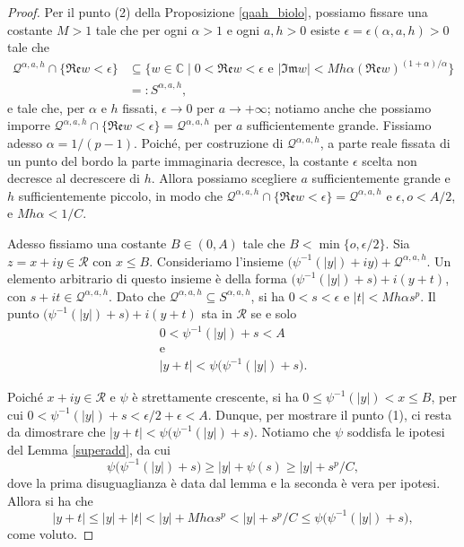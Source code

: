 \begin{proof}
    Per il punto (2) della Proposizione \ref{qaah_biolo}, possiamo fissare una costante $M>1$ tale che per ogni $\alpha>1$ e ogni $a,h>0$ esiste $\epsilon=\epsilon(\alpha,a,h)>0$ tale che
    \begin{align*}
        \mathcal{Q}^{\alpha,a,h}\cap\{\mathfrak{Re}w<\epsilon\}&\subseteq \{w\in\mathbb{C}\mid 0<\mathfrak{Re}w<\epsilon\text{ e }|\mathfrak{Im}w|<Mh\alpha(\mathfrak{Re}w)^{(1+\alpha)/\alpha}\}\\
        &=:S^{\alpha,a,h},
    \end{align*}
    e tale che, per $\alpha$ e $h$ fissati, $\epsilon\longrightarrow0$ per $a\longrightarrow+\infty$; notiamo anche che possiamo imporre $\mathcal{Q}^{\alpha,a,h}\cap\{\mathfrak{Re}w<\epsilon\}=\mathcal{Q}^{\alpha,a,h}$ per $a$ sufficientemente grande. Fissiamo adesso $\alpha=1/(p-1)$. Poiché, per costruzione di $\mathcal{Q}^{\alpha,a,h}$, a parte reale fissata di un punto del bordo la parte immaginaria decresce, la costante $\epsilon$ scelta non decresce al decrescere di $h$. Allora possiamo scegliere $a$ sufficientemente grande e $h$ sufficientemente piccolo, in modo che $\mathcal{Q}^{\alpha,a,h}\cap\{\mathfrak{Re}w<\epsilon\}=\mathcal{Q}^{\alpha,a,h}$ e $\epsilon,o<A/2$, e $Mh\alpha<1/C$.
    
    Adesso fissiamo una costante $B\in(0,A)$ tale che $B<\min\{o,\epsilon/2\}$. Sia $z=x+iy\in\mathcal{R}$ con $x\le B$. Consideriamo l'insieme $\bigl(\psi^{-1}(|y|)+iy\bigr)+\mathcal{Q}^{\alpha,a,h}$. Un elemento arbitrario di questo insieme è della forma $\bigl(\psi^{-1}(|y|)+s\bigr)+i(y+t)$, con $s+it\in\mathcal{Q}^{\alpha,a,h}$. Dato che $\mathcal{Q}^{\alpha,a,h}\subseteq S^{\alpha,a,h}$, si ha $0<s<\epsilon$ e $|t|<Mh\alpha s^p$. Il punto $\bigl(\psi^{-1}(|y|)+s\bigr)+i(y+t)$ sta in $\mathcal{R}$ se e solo \begin{gather*}
        0<\psi^{-1}(|y|)+s<A\\
        \text{e}\\
        |y+t|<\psi\big(\psi^{-1}(|y|)+s\big).
    \end{gather*}

    Poiché $x+iy\in\mathcal{R}$ e $\psi$ è strettamente crescente, si ha $0 \le \psi^{-1}(|y|)<x\le B$, per cui $0<\psi^{-1}(|y|)+s<\epsilon/2+\epsilon<A$. Dunque, per mostrare il punto (1), ci resta da dimostrare che $|y+t|<\psi\big(\psi^{-1}(|y|)+s\big)$. Notiamo che $\psi$ soddisfa le ipotesi del Lemma \ref{superadd}, da cui
    $$\psi\big(\psi^{-1}(|y|)+s\big)\ge |y|+\psi(s)\ge |y|+s^p/C,$$
    dove la prima disuguaglianza è data dal lemma e la seconda è vera per ipotesi. Allora si ha che
    $$|y+t| \le |y|+|t|<|y|+Mh\alpha s^p<|y|+s^p/C \le \psi\big(\psi^{-1}(|y|)+s\big),$$
    come voluto.


\end{proof}
